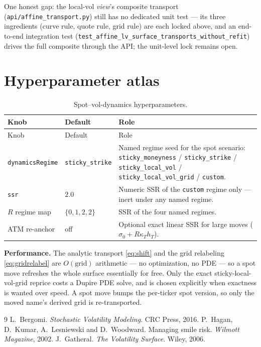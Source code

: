 \documentclass[11pt]{article}
\begin{document}
\noindent One honest gap: the local-vol \emph{view}'s composite transport
(\nolinkurl{api/affine_transport.py}) still has no dedicated unit test ---
its three
ingredients (curve rule, quote rule, grid rule) are each locked above, and
an end-to-end integration test
(\nolinkurl{test_affine_lv_surface_transports_without_refit}) drives the
full composite through the API; the unit-level lock remains open.

\appendix
\section{Hyperparameter atlas}
\label{app:atlas}

\begin{longtable}{p{}p{}p{}}
\caption{Spot--vol-dynamics hyperparameters.}\label{tab:atlas}\\
\toprule Knob & Default & Role\\ \midrule
\endfirsthead \toprule Knob & Default & Role\\ \midrule \endhead
\texttt{dynamicsRegime} & \texttt{sticky\_strike} & Named regime seed for the
spot scenario: \texttt{sticky\_moneyness} / \texttt{sticky\_strike} /
\texttt{sticky\_local\_vol} / \texttt{sticky\_local\_vol\_grid} /
\texttt{custom}.\\
\texttt{ssr} & $2.0$ & Numeric SSR of the \texttt{custom} regime only ---
inert under any named regime.\\
$R$ regime map & $\{0,1,2,2\}$ & SSR of the four named regimes.\\
ATM re-anchor & off & Optional exact linear SSR for large moves ($\sigma_0+R\kappa_T h_T$).\\
\bottomrule
\end{longtable}

\noindent\textbf{Performance.} The analytic transport \eqref{eq:shift} and the grid
relabeling \eqref{eq:gridrelabel} are $O(\text{grid})$ arithmetic --- no
optimization, no PDE --- so a spot move refreshes the whole surface essentially for
free. Only the exact sticky-local-vol-grid reprice costs a Dupire PDE solve, and is
chosen explicitly when exactness is wanted over speed. A spot move bumps the
per-ticker spot version, so only the moved name's derived grid is re-transported.

\begin{thebibliography}{9}
 L.~Bergomi. \emph{Stochastic Volatility Modeling}. CRC Press,
2016.
 P.~Hagan, D.~Kumar, A.~Lesniewski and D.~Woodward. Managing
smile risk. \emph{Wilmott Magazine}, 2002.
 J.~Gatheral. \emph{The Volatility Surface}. Wiley, 2006.
\end{thebibliography}
\end{document}
